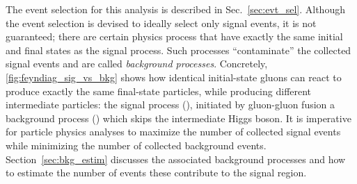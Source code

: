 The event selection for this analysis is described in Sec.~\ref{sec:evt_sel}.
Although the event selection is devised to ideally select only signal events, it is not guaranteed;
there are certain physics process that have exactly the same initial and final states as the signal process.
Such processes ``contaminate'' the collected signal events and are called \emph{background processes}.
Concretely, \cref{fig:feyndiag_sig_vs_bkg} shows how identical initial-state gluons can react to produce exactly the same final-state particles, while producing different intermediate particles:
the signal process (\gghzzfourl), initiated by gluon-gluon fusion \vs a background process (\ggzzfourl) which skips the intermediate Higgs boson.
It is imperative for particle physics analyses to maximize the number of collected signal events while minimizing the number of collected background events.
Section~\ref{sec:bkg_estim} discusses the associated background processes and how to estimate the number of events these contribute to the signal region.

